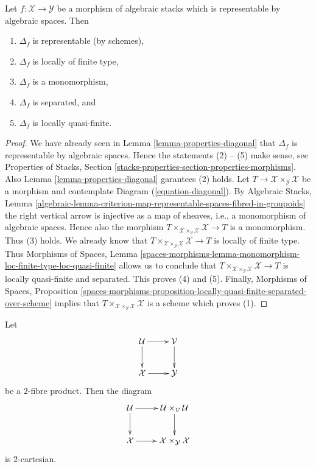 \begin{lemma}
\label{lemma-properties-diagonal-representable}
Let $f : \mathcal{X} \to \mathcal{Y}$ be a morphism of algebraic stacks
which is representable by algebraic spaces. Then
\begin{enumerate}
\item $\Delta_f$ is representable
(by schemes),
\item $\Delta_f$ is locally of finite type,
\item $\Delta_f$ is a monomorphism,
\item $\Delta_f$ is separated, and
\item $\Delta_f$ is locally quasi-finite.
\end{enumerate}
\end{lemma}

\begin{proof}
We have already seen in
Lemma \ref{lemma-properties-diagonal}
that $\Delta_f$ is representable by algebraic
spaces. Hence the statements (2) -- (5) make sense, see
Properties of Stacks,
Section \ref{stacks-properties-section-properties-morphisms}.
Also
Lemma \ref{lemma-properties-diagonal}
garantees (2) holds.
Let $T \to \mathcal{X} \times_{\mathcal{Y}} \mathcal{X}$ be a morphism
and contemplate Diagram (\ref{equation-diagonal}). By
Algebraic Stacks, Lemma
\ref{algebraic-lemma-criterion-map-representable-spaces-fibred-in-groupoids}
the right vertical arrow is injective as a map of sheaves, i.e., a
monomorphism of algebraic spaces. Hence also the morphism
$T \times_{\mathcal{X} \times_{\mathcal{Y}} \mathcal{X}} \mathcal{X} \to T$
is a monomorphism. Thus (3) holds. We already know that
$T \times_{\mathcal{X} \times_{\mathcal{Y}} \mathcal{X}} \mathcal{X} \to T$
is locally of finite type. Thus
Morphisms of Spaces, Lemma
\ref{spaces-morphisms-lemma-monomorphism-loc-finite-type-loc-quasi-finite}
allows us to conclude that
$T \times_{\mathcal{X} \times_{\mathcal{Y}} \mathcal{X}} \mathcal{X} \to T$
is locally quasi-finite and separated. This proves (4) and (5).
Finally,
Morphisms of Spaces, Proposition
\ref{spaces-morphisms-proposition-locally-quasi-finite-separated-over-scheme}
implies that
$T \times_{\mathcal{X} \times_{\mathcal{Y}} \mathcal{X}} \mathcal{X}$
is a scheme which proves (1).
\end{proof}

\begin{lemma}
\label{lemma-base-change-diagonal}
Let
$$
\xymatrix{
\mathcal{U} \ar[d] \ar[r] & \mathcal{V} \ar[d] \\
\mathcal{X} \ar[r] & \mathcal{Y}
}
$$
be a $2$-fibre product. Then the diagram
$$
\xymatrix{
\mathcal{U} \ar[d] \ar[r] &
\mathcal{U} \times_{\mathcal{V}} \mathcal{U} \ar[d] \\
\mathcal{X} \ar[r] &
\mathcal{X} \times_{\mathcal{Y}} \mathcal{X}
}
$$
is $2$-cartesian.
\end{lemma}

